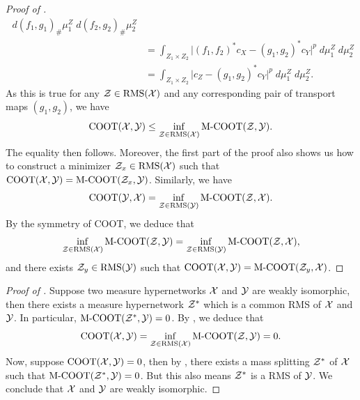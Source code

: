 \begin{proof}[Proof of ]
\begin{align}
    \; d (f_1,g_1)_{\#} \mu_1^Z \; d (f_2,g_2)_{\#} \mu_2^Z \\
    &= \int_{Z_1 \times Z_2} \vert (f_1,f_2)^*c_X - (g_1,g_2)^*c_Y \vert^p \; d\mu_1^Z \; d\mu_2^Z \\
    &= \int_{Z_1 \times Z_2} \vert c_Z - (g_1,g_2)^*c_Y \vert^p \; d\mu_1^Z \; d\mu_2^Z.
  \end{align}
  As this is true for any $\mathcal Z \in \text{RMS}(\mathcal X)$ and any corresponding pair of transport maps
  $(g_1, g_2)$, we have
  \begin{equation}
    \text{COOT}(\mathcal X, \mathcal Y) \leq \inf_{\mathcal Z \in \text{RMS}(\mathcal X)} \text{M-COOT}(\mathcal Z, \mathcal Y).
  \end{equation}
  The equality then follows. Moreover, the first part of the proof also
  shows us how to construct a minimizer $\mathcal Z_x \in \text{RMS}(\mathcal X)$ such that
  $\text{COOT}(\mathcal X, \mathcal Y) = \text{M-COOT}(\mathcal Z_x, \mathcal Y)$. Similarly, we have
  \begin{equation}
    \text{COOT}(\mathcal Y, \mathcal X) = \inf_{\mathcal Z \in \text{RMS}(\mathcal Y)} \text{M-COOT}(\mathcal Z, \mathcal X).
  \end{equation}
  By the symmetry of COOT, we deduce that
  \begin{equation}
    \inf_{\mathcal Z \in \text{RMS}(\mathcal X)} \text{M-COOT}(\mathcal Z, \mathcal Y) = \inf_{\mathcal Z \in \text{RMS}(\mathcal Y)} \text{M-COOT}(\mathcal Z, \mathcal X),
  \end{equation}
  and there exists $\mathcal Z_y \in \text{RMS}(\mathcal Y)$ such that $\text{COOT}(\mathcal X, \mathcal Y) = \text{M-COOT}(\mathcal Z_y, \mathcal X)$.
\end{proof}

\begin{proof}[Proof of ]
    Suppose two measure hypernetworks $\mathcal X$ and $\mathcal Y$ are weakly isomorphic,
    then there exists a measure hypernetwork $\mathcal Z^*$ which is a common RMS of $\mathcal X$ and $\mathcal Y$.
    In particular, $\text{M-COOT}(\mathcal Z^*, \mathcal Y) = 0$. By , we deduce that
    \begin{equation}
      \text{COOT}(\mathcal X, \mathcal Y) = \inf_{\mathcal Z \in \text{RMS}(\mathcal X)} \text{M-COOT}(\mathcal Z, \mathcal Y) = 0.
    \end{equation}
    Now, suppose $\text{COOT}(\mathcal X, \mathcal Y)=0$, then by ,
    there exists a mass splitting $\mathcal Z^*$ of $\mathcal X$ such that
    $\text{M-COOT}(\mathcal Z^*, \mathcal Y) = 0$. But this also means $\mathcal Z^*$ is a RMS of $\mathcal Y$.
    We conclude that $\mathcal X$ and $\mathcal Y$ are weakly isomorphic.
\end{proof}

